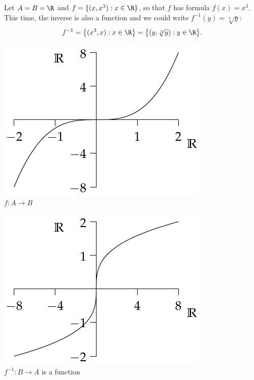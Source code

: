\begin{examples}
\item\label{ex:reln2} Let $A=B=\R$ and $f=\{(x,x^3):x\in\R\}$, so that $f$ has formula $f(x)=x^3$. This time, the inverse is also a function and we could write $f^{-1}(y)=\sqrt[3]{y}$:
\[f^{-1}=\bigl\{(x^3,x):x\in\R\bigr\}=\bigl\{(y,\sqrt[3]{y}):y\in\R\bigr\}.\]
\begin{center}
\begin{minipage}{0.35\textwidth}\centering
\includegraphics[width=\textwidth]{relations-22-reln3}\\
$f:A\to B$
\end{minipage}\qquad\qquad\qquad
\begin{minipage}{0.35\textwidth}\centering
\includegraphics[width=\textwidth]{relations-23-reln3}\\
$f^{-1}:B\to A$ is a function
\end{minipage}
\end{center}
\end{examples}\pagebreak[2]

